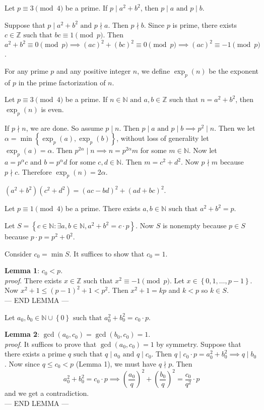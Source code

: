 \documentclass[11pt]{article}
\theoremstyle{definition}
\newcommand{\The}[2]{\begin{#1}#2\end{#1}}
\newcommand{\Lemma}[1]{\noindent\textbf{Lemma #1}: } %
\newcommand{\set}[1]{\left\{ #1 \right\}}
\newcommand{\nl}[0]{\vspace{12pt}}
\newcommand{\rng}[2]{#1,\dots,#2}
\newcommand{\st}[0]{\text{ such that }}
\newcommand{\et}[0]{\text{ and }}
\newcommand{\ZZ}{\mathbb{Z}}
\newcommand{\NN}{\mathbb{N}}
\begin{document}
\The{cor} {
	Let $p\equiv 3 \pmod{4}$ be a prime. If $p\mid a^2+b^2$, then $p\mid a \et p\mid b$. 
} 
\proof Suppose that $p\mid a^2+b^2 \et p\nmid a$. Then $p\nmid b$. 
Since $p$ is prime, there exists $c\in\ZZ \st bc\equiv 1\pmod{p}$. Then $a^2+b^2 \equiv 0 \pmod{p} \implies (ac)^2+(bc)^2 \equiv 0 \pmod{p} \implies (ac)^2\equiv -1 \pmod{p}$. 
\qedhere

\The{defn} {
	For any prime $p$ and any positive integer $n$, we define $\exp_p(n)$ be the exponent of $p$ in the prime factorization of $n$. 
}
\The{prop} {
	Let $p\equiv 3 \pmod{4}$ be a prime. If $n\in\NN \et a,b\in\ZZ$ such that $n=a^2+b^2$, then $\exp_p(n)$ is even.
}
\proof If $p\nmid n$, we are done. So assume $p\mid n$. Then $p\mid a \et p\mid b \implies p^2\mid n$. 
Then we let $\alpha = \min\set{\exp_p(a), \exp_p(b)}$, without loss of generality let $\exp_p(a) = \alpha$. Then $p^{2\alpha} \mid n \implies n = p^{2\alpha} m$ for some $m\in\NN$. 
Now let $a=p^\alpha c \et b=p^\alpha d$ for some $c,d\in\NN$. Then $m=c^2+d^2$. Now $p\nmid m$ because $p\nmid c$. Therefore $\exp_p(n) = 2\alpha$. 
\qedhere

\The{prop} {
	$ (a^2+b^2)(c^2+d^2) = (ac-bd)^2 + (ad+bc)^2 $. 
}
\The{prop} {
	Let $p\equiv 1 \pmod{4}$ be a prime. There exists $a,b\in\NN \st a^2+b^2 = p$. 
}
\proof
Let $S=\set{c\in\NN : \exists a,b\in\NN, a^2+b^2=c\cdot p}$. Now $S$ is nonempty because $p\in S$ because $p\cdot p = p^2 + 0^2$. 

Consider $c_0 = \min S$. It suffices to show that $c_0 = 1$. 

\nl
\Lemma{1} $c_0 < p$. 
\\\indent\emph{proof}. There exists $x\in\ZZ \st x^2 \equiv -1 \pmod{p}$. Let $x\in\set{0,\rng{1}{p-1}}$. Now $x^2 + 1 \le (p-1)^2 + 1 < p^2$. Then $x^2+1 = kp$ and $k<p$ so $k\in S$. 
\\--- END LEMMA ---\nl

Let $a_0,b_0\in\NN\cup\set{0} \st a_0^2 + b_0^2 = c_0 \cdot p$. 

\nl
\Lemma{2} $\gcd(a_0,c_0) = \gcd(b_0,c_0) = 1$. 
\\\indent\emph{proof}. It suffices to prove that $\gcd(a_0,c_0) = 1$ by symmetry. 
Suppose that there exists a prime $q \st q\mid a_0 \et q\mid c_0$. Then $q\mid c_0\cdot p = a_0^2 + b_0^2 \implies q\mid b_0$. Now since $q \le c_0 < p$ (Lemma 1), we must have $q\nmid p$. Then
$$ a_0^2 + b_0^2 = c_0\cdot p \implies \left(\frac{a_0}{q}\right)^2 + \left(\frac{b_0}{q}\right)^2 = \frac{c_0}{q^2}\cdot p $$
and we get a contradiction.
\\--- END LEMMA ---\nl
\end{document}
